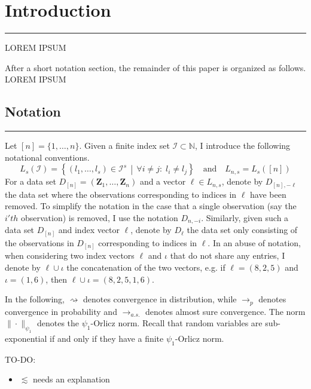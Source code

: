 \section{Introduction}
\hrule
	{\color{red} LOREM IPSUM}

After a short notation section, the remainder of this paper is organized as follows.
{\color{red} LOREM IPSUM}

\subsection{Notation}
\hrule
Let $[n] = \{1, \dotsc, n\}$.
Given a finite index set $\mathcal{I} \subset \mathbb{N}$, I introduce the following notational conventions.
\begin{equation}
	L_{s}(\mathcal{I}) = \left\{\left(l_1, \dotsc, l_s\right) \in \mathcal{I}^{s} \, \middle| \, \forall i \neq j: \; l_i \neq l_j\right\}
	\quad \text{and} \quad
	L_{n,s} = L_s\left([n]\right)
\end{equation}
For a data set $D_{[n]} = \left(\mathbf{Z}_1, \dotsc, \mathbf{Z}_{n}\right)$ and a vector $\ell \in L_{n,s}$, denote by $D_{[n], -\ell}$ the data set where the observations corresponding to indices in $\ell$ have been removed.
To simplify the notation in the case that a single observation (say the $i'th$ observation) is removed, I use the notation $D_{n, -i}$.
Similarly, given such a data set $D_{[n]}$ and index vector $\ell$, denote by $D_{\ell}$ the data set only consisting of the observations in $D_{[n]}$ corresponding to indices in $\ell$.
In an abuse of notation, when considering two index vectors $\ell$ and $\iota$ that do not share any entries, I denote by $\ell \cup \iota$ the concatenation of the two vectors, e.g. if $\ell = (8,2,5)$ and $\iota = (1,6)$, then $\ell \cup \iota = (8,2,5,1,6)$.

In the following, $\rightsquigarrow$ denotes convergence in distribution, while $\rightarrow_{p}$ denotes convergence in probability and $\rightarrow_{a.s.}$ denotes almost sure convergence.
The norm $\| \cdot \|_{\psi_1}$ denotes the $\psi_1$-Orlicz norm.
Recall that random variables are sub-exponential if and only if they have a finite $\psi_1$-Orlicz norm.

{\color{red} TO-DO:}
\begin{itemize}
	\item $\lesssim$ needs an explanation
\end{itemize}